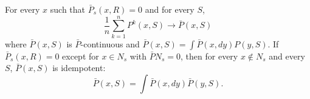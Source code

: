 For every $x$ such that $\bar{P}_s(x, R) = 0$ and for every $S$, $$\frac{1}{n} \sum_{k=1}^{n} P^k(x, S) \to \bar{P}(x, S)$$ where $\bar{P}(x, S)$ is $\bar{P}$-continuous and $\bar{P}(x, S) = \int \bar{P}(x, dy) P(y, S)$. If $\bar{P}_s(x, R) = 0$ except for $x \in N_s$ with $\bar{P}N_s = 0$, then for every $x \notin N_s$ and every $S$, $\bar{P}(x, S)$ is idempotent: $$\bar{P}(x, S) = \int \bar{P}(x, dy) \bar{P}(y, S).$$
